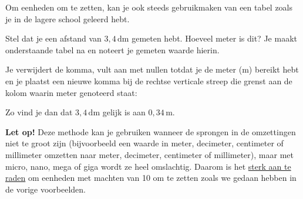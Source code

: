 \documentclass{ximera}
\begin{document}
\begin{remark}\nl
    Om eenheden om te zetten, kan je ook steeds gebruikmaken van een tabel zoals je in de lagere school geleerd hebt.

    Stel dat je een afstand van $3{,}4 \, \mathrm{dm}$ gemeten hebt. Hoeveel meter is dit? Je maakt onderstaande tabel na en noteert je gemeten waarde hierin.
    \begin{center}
    \end{center}
    Je verwijdert de komma, vult aan met nullen totdat je de meter ($\mathrm{m}$) bereikt hebt en je plaatst een nieuwe komma bij de rechtse verticale streep die grenst aan de kolom waarin meter genoteerd staat:
    \begin{center}
    \end{center}
    Zo vind je dan dat $3{,}4 \, \mathrm{dm}$ gelijk is aan $0{,}34 \, \mathrm{m}$.

    \textbf{Let op!} Deze methode kan je gebruiken wanneer de sprongen in de omzettingen niet te groot zijn (bijvoorbeeld een waarde in meter, decimeter, centimeter of millimeter omzetten naar meter, decimeter, centimeter of millimeter), maar met micro, nano, mega of giga wordt ze heel omslachtig. Daarom is het \underline{sterk aan te raden} om eenheden met machten van 10 om te zetten zoals we gedaan hebben in de vorige voorbeelden.
\end{remark}
\end{document}
